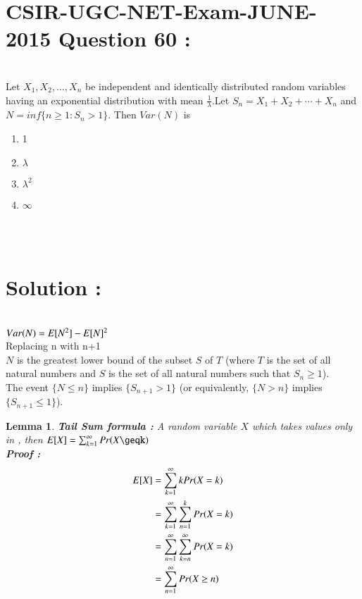 \documentclass[journal,12pt,twocolumn]{IEEEtran}
\newtheorem{lemma}[theorem]{Lemma}
\begin{document}
\section{CSIR-UGC-NET-Exam-JUNE-2015 Question 60 :}\\
Let $X_1, X_2, \dots, X_n$ be independent and identically distributed random variables having an exponential distribution with mean $\frac{1}{\lambda}$.Let $S_n = X_1 + X_2 + \cdots + X_n$ and $N = inf \{n \geq 1: S_n > 1\}$. Then $Var(N)$ is\\
\begin{enumerate}
    \item 1
    \item $\lambda$
    \item $\lambda^2$
    \item $\infty$
\end{enumerate}
\\ \\
\section{Solution :}\\
$Var(N) = E[ N^2 ] - E[ N ]^2$\\
Replacing n with n+1\\
$N$ is the greatest lower bound of the subset $S$ of $T$ (where $T$ is the set of all natural numbers and $S$ is the set of all natural numbers such that $S_n \geq 1$).\\
The event $\{N \leq n\}$ implies $\{S_{n+1} > 1\}$ (or equivalently, $\{N > n\}$ implies $\{S_{n+1} \leq 1\}$).\\

\begin{lemma}
\textbf{Tail Sum formula : } A random variable $X$ which takes values only in , then $\mean{X} = \sum _{k=1} ^\infty Pr(X\geqk)$\\
\textbf{Proof : }\\
\begin{align}
    E[ X ] &= \sum _{k = 1} ^\infty k Pr(X=k)\\
    &= \sum _{k = 1} ^\infty \sum _{n=1} ^k Pr(X=k)\\
    &= \sum _{n = 1} ^\infty \sum _{k = n} ^\infty Pr(X=k)\\
    &= \sum _{n = 1} ^\infty Pr(X\geq n)
\end{align}
\end{lemma}
\end{document}
